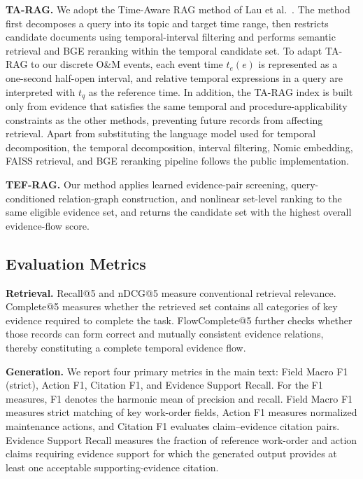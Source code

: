 \textbf{TA-RAG.}
We adopt the Time-Aware RAG method of Lau et al.~\cite{lau2025tarag}. The method first decomposes a query into its topic and target time range, then restricts candidate documents using temporal-interval filtering and performs semantic retrieval and BGE reranking within the temporal candidate set. To adapt TA-RAG to our discrete O\&M events, each event time $t_e(e)$ is represented as a one-second half-open interval, and relative temporal expressions in a query are interpreted with $t_q$ as the reference time. In addition, the TA-RAG index is built only from evidence that satisfies the same temporal and procedure-applicability constraints as the other methods, preventing future records from affecting retrieval. 
Apart from substituting the language model used for temporal decomposition, the temporal decomposition, interval filtering, Nomic embedding, FAISS retrieval, and BGE reranking pipeline follows the public implementation.

\textbf{TEF-RAG.}
Our method applies learned evidence-pair screening, query-conditioned relation-graph construction, and nonlinear set-level ranking to the same eligible evidence set, and returns the candidate set with the highest overall evidence-flow score.

\subsection{Evaluation Metrics}
\label{sec:metrics}

\textbf{Retrieval.}
Recall@5 and nDCG@5 measure conventional retrieval relevance. Complete@5 measures whether the retrieved set contains all categories of key evidence required to complete the task. FlowComplete@5 further checks whether those records can form correct and mutually consistent evidence relations, thereby constituting a complete temporal evidence flow.

\textbf{Generation.}
We report four primary metrics in the main text: Field Macro F1 (strict), Action F1, Citation F1, and Evidence Support Recall. For the F1 measures, F1 denotes the harmonic mean of precision and recall. Field Macro F1 measures strict matching of key work-order fields, Action F1 measures normalized maintenance actions, and Citation F1 evaluates claim--evidence citation pairs. Evidence Support Recall measures the fraction of reference work-order and action claims requiring evidence support for which the generated output provides at least one acceptable supporting-evidence citation.

